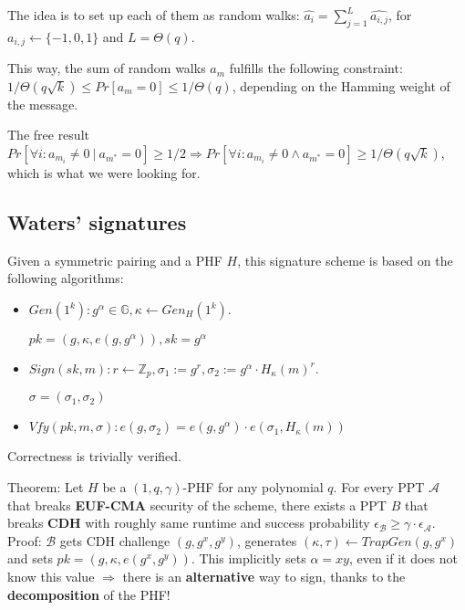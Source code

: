 \documentclass[oneside]{book}
\newcommand{\Z}[0]{\mathbb{Z}}
\newcommand{\G}[0]{\mathbb{G}}
\newcommand{\cA}[0]{\mathcal{A}}
\newcommand{\cB}[0]{\mathcal{B}}
\newcommand{\epsA}[0]{\epsilon_\cA}
\newcommand{\epsB}[0]{\epsilon_\cB}
\begin{document}
The idea is to set up each of them as random walks: ${\displaystyle \widehat{a_i} = \sum_{j=1}^{L}\widehat{a_{i,j}}}$, for $\widehat{a_{i,j}} \leftarrow \{-1,0,1\}$ and $L = \Theta(q)$.

This way, the sum of random walks $a_m$ fulfills the following constraint: $1/\Theta(q\sqrt{k}) \le Pr[a_m = 0] \le 1/\Theta(q)$, depending on the Hamming weight of the message.

The free result $Pr[\forall i: a_{m_i} \neq 0\ |\ a_{m^*} = 0] \ge 1/2 \Rightarrow Pr[\forall i: a_{m_i} \neq 0 \land a_{m^*} = 0] \ge 1/\Theta(q\sqrt{k})$, which is what we were looking for.

\subsection{Waters' signatures}
Given a symmetric pairing and a PHF $H$, this signature scheme is based on the following algorithms:
\begin{itemize}
    \item $Gen(1^k): g^{\alpha} \in \G, \kappa \leftarrow Gen_H(1^k)$.
    
    $pk = (g, \kappa, e(g, g^\alpha)), sk = g^\alpha$
    
    \item $Sign(sk, m): r \leftarrow \Z_p, \sigma_1 := g^r, \sigma_2 := g^\alpha\cdot H_\kappa(m)^r$.
    
    $\sigma = (\sigma_1, \sigma_2)$
    
    \item $Vfy(pk, m, \sigma): e(g, \sigma_2) = e(g, g^\alpha) \cdot e(\sigma_1, H_\kappa(m))$
\end{itemize}

Correctness is trivially verified.

Theorem: Let $H$ be a $(1, q, \gamma)$-PHF for any polynomial $q$. For every PPT $\cA$ that breaks \textbf{EUF-CMA} security of the scheme, there exists a PPT $B$ that breaks \textbf{CDH} with roughly same runtime and success probability $\epsB \ge \gamma \cdot \epsA$.\\

Proof: $\cB$ gets CDH challenge $(g, g^x, g^y)$, generates $(\kappa, \tau) \leftarrow TrapGen(g, g^x)$ and sets $pk = (g, \kappa, e(g^x, g^y))$. This implicitly sets $\alpha = xy$, even if it does not know this value $\Rightarrow$ there is an \textbf{alternative} way to sign, thanks to the \textbf{decomposition} of the PHF!\\
\end{document}
